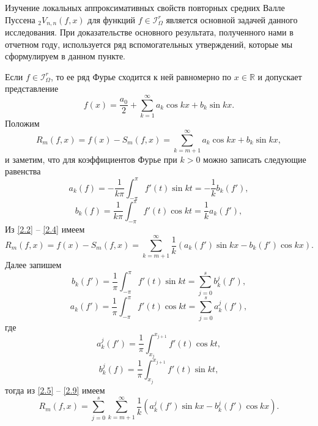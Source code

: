 Изучение локальных аппроксимативных свойств повторных средних Валле Пуссена $_2V_{n,n}(f,x)$ для функций $f\in \mathcal{ I}^r_\Omega$ является основной задачей данного исследования.
При доказательстве основного результата, полученного нами в отчетном году, используется ряд вспомогательных утверждений, которые мы сформулируем в данном пункте.

Если $f\in \mathcal{ I}^r_\Omega$, то ее ряд Фурье сходится к ней равномерно по $x\in\mathbb{R}$  и допускает представление
\begin{equation}\label{2.1}
    f(x) = \frac{a_0}{2}+ \sum_{k=1}^\infty a_k\cos kx+b_k\sin kx.
\end{equation}
 Положим
\begin{equation}\label{2.2}
R_m(f,x)=f(x)-S_m(f,x)=\sum_{k=m+1}^\infty a_k\cos kx+b_k\sin kx,
\end{equation}
и заметим, что для коэффициентов  Фурье при $k>0$ можно записать следующие равенства
\begin{equation}\label{2.3}
a_k(f)=-\frac1{k \pi}\int_{-\pi}^\pi f'(t)\sin kt=-\frac1kb_k(f'),
   \end{equation}
\begin{equation}\label{2.4}
b_k(f)=\frac1{k \pi}\int_{-\pi}^\pi f'(t)\cos kt=\frac1ka_k(f'),
   \end{equation}
Из \eqref{2.2} -- \eqref{2.4} имеем
\begin{equation}\label{2.5}
R_m(f,x)=f(x)-S_m(f,x)=\sum_{k=m+1}^\infty\frac{1}{k}(a_k(f')\sin kx-b_k(f')\cos kx).
\end{equation}
Далее запишем
   \begin{equation}\label{2.6}
b_k(f')=\frac1\pi\int_{-\pi}^\pi f'(t)\sin kt=\sum_{j=0}^s b_k^j(f'),
   \end{equation}
\begin{equation}\label{2.7}
a_k(f')=\frac1\pi\int_{-\pi}^\pi f'(t)\cos kt=\sum_{j=0}^s a_k^j(f'),
   \end{equation}
 где
\begin{equation}\label{2.8}
a_k^j(f')=\frac1\pi\int_{x_j}^{x_{j+1}} f'(t)\cos kt,
   \end{equation}
\begin{equation}\label{2.9}
b_k^j(f)=\frac1\pi\int_{x_j}^{x_{j+1}} f'(t)\sin kt,
   \end{equation}
 тогда из \eqref{2.5} -- \eqref{2.9} имеем
\begin{equation}\label{2.10}
R_m(f,x)=\sum_{j=0}^s\sum_{k=m+1}^\infty\frac1k(a_k^j(f')\sin kx-b_k^j(f')\cos kx).
   \end{equation}
